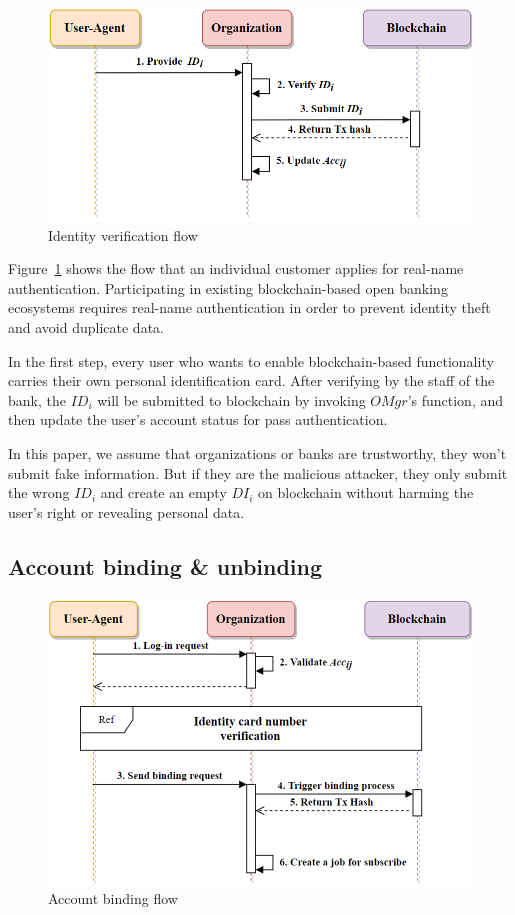     \begin{figure}[htb]
        \centering
        \includegraphics[height=!,width=0.8\linewidth,keepaspectratio=true]{figures/identity_verification.png}
        \caption{{\footnotesize Identity verification flow}}
        \label{fig:identityVerification}
    \end{figure}
    Figure~\ref{fig:identityVerification} shows the flow that an individual customer applies for real-name authentication. Participating in existing blockchain-based open banking ecosystems requires real-name authentication in order to prevent identity theft and avoid duplicate data. \par
    In the first step, every user who wants to enable blockchain-based functionality carries their own personal identification card. After verifying by the staff of the bank, the \(ID_i\) will be submitted to blockchain by invoking \(OMgr\)'s function, and then update the user's account status for pass authentication.\par
    In this paper, we assume that organizations or banks are trustworthy, they won't submit fake information. But if they are the malicious attacker, they only submit the wrong \(ID_i\) and create an empty \(DI_i\) on blockchain without harming the user's right or revealing personal data.

    \newpage
    \subsection{Account binding \& unbinding}
    \begin{figure}[htb]
        \centering
        \includegraphics[height=!,width=0.8\linewidth,keepaspectratio=true]{figures/account_binding.png}
        \caption{{\footnotesize Account binding flow}}
        \label{fig:accountBinding}
    \end{figure}

